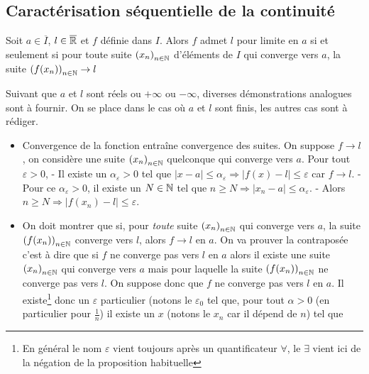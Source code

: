 \subsection{Caractérisation séquentielle de la continuité}
\begin{thm}
  Soit $a\in \overline{I}$, $l\in \overline{\mathbb{R}}$ et $f$ définie dans $I$. Alors $f$ admet $l$ pour limite en $a$ si et seulement si pour toute suite $\left( x_n\right)_{n\in \mathbb{N}}$ d'éléments de $I$ qui converge vers $a$, la suite $\left( f(x_n)\right)_{n\in \mathbb{N}} \rightarrow l$
\end{thm}
\begin{demo}
  Suivant que $a$ et $l$ sont réels ou $+\infty$ ou $-\infty$, diverses démonstrations analogues sont à fournir. On se place dans le cas où $a$ et $l$ sont finis, les autres cas sont à rédiger.
  \begin{itemize}
    \item Convergence de la fonction entraîne convergence des suites. On suppose $f\rightarrow l$, on considère une suite $\left( x_n\right)_{n\in \mathbb{N}}$ quelconque qui converge vers $a$.
  Pour tout $\varepsilon >0$, - Il existe un $\alpha_\varepsilon > 0$ tel que $|x-a|\leq \alpha_\varepsilon \Rightarrow |f(x)-l|\leq \varepsilon$ car $f\rightarrow l$. - Pour ce $\alpha_\varepsilon > 0$, il existe un $N\in \mathbb{N}$ tel que $n\geq N \Rightarrow |x_n-a|\leq \alpha_\varepsilon$. - Alors $n\geq N \Rightarrow |f(x_n)-l|\leq \varepsilon$.
    \item On doit montrer que si, pour \emph{toute} suite $\left( x_n\right)_{n\in \mathbb{N}}$ qui converge vers $a$, la suite $\left( f(x_n)\right)_{n\in \mathbb{N}}$ converge vers $l$, alors $f\rightarrow l$ en $a$. On va prouver la contraposée c'est à dire que si $f$ ne converge pas vers $l$ en $a$ alors il existe une suite $\left( x_n\right)_{n\in \mathbb{N}}$ qui converge vers $a$ mais pour laquelle la suite $\left( f(x_n)\right)_{n\in \mathbb{N}}$ ne converge pas vers $l$.\newline
    On suppose donc que $f$ ne converge pas vers $l$ en $a$.\newline
    Il existe\footnote{En général le nom $\varepsilon$ vient toujours après un quantificateur $\forall$, le $\exists$ vient ici de la négation de la proposition habituelle} donc un $\varepsilon$ particulier (notons le $\varepsilon_0$ tel que, pour tout $\alpha >0$ (en particulier pour $\frac{1}{n}$) il existe un $x$ (notons le $x_n$ car il dépend de $n$) tel que

\end{itemize}
\end{demo}
